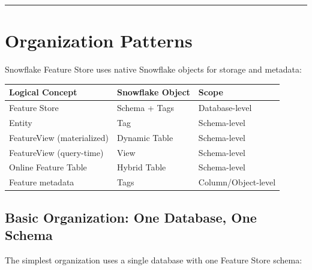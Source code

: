 \documentclass[
  letterpaper,
  DIV=11,
  numbers=noendperiod]{scrreprt}
\begin{document}
\begin{center}\rule{0.5\linewidth}{0.5pt}\end{center}

\hypertarget{organization-patterns}{%
\section{Organization Patterns}\label{organization-patterns}}

Snowflake Feature Store uses native Snowflake objects for storage and
metadata:

\begin{longtable}[]{@{}lll@{}}
\toprule\noalign{}
Logical Concept & Snowflake Object & Scope \\
\midrule\noalign{}
\endhead
\bottomrule\noalign{}
\endlastfoot
Feature Store & Schema + Tags & Database-level \\
Entity & Tag & Schema-level \\
FeatureView (materialized) & Dynamic Table & Schema-level \\
FeatureView (query-time) & View & Schema-level \\
Online Feature Table & Hybrid Table & Schema-level \\
Feature metadata & Tags & Column/Object-level \\
\end{longtable}

\hypertarget{basic-organization-one-database-one-schema}{%
\subsection{Basic Organization: One Database, One
Schema}\label{basic-organization-one-database-one-schema}}

The simplest organization uses a single database with one Feature Store
schema:
\end{document}
